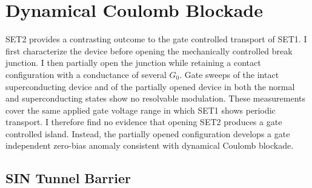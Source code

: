 
\section{Dynamical Coulomb Blockade}
\label{sec:ssn-set:dynamic}

    SET2 provides a contrasting outcome to the gate controlled transport of SET1. I first characterize the device before opening the mechanically controlled break junction. I then partially open the junction while retaining a contact configuration with a conductance of several $G_0$. Gate sweeps of the intact superconducting device and of the partially opened device in both the normal and superconducting states show no resolvable modulation. These measurements cover the same applied gate voltage range in which SET1 shows periodic transport. I therefore find no evidence that opening SET2 produces a gate controlled island. Instead, the partially opened configuration develops a gate independent zero-bias anomaly consistent with dynamical Coulomb blockade.

    \subsection*{SIN Tunnel Barrier}



